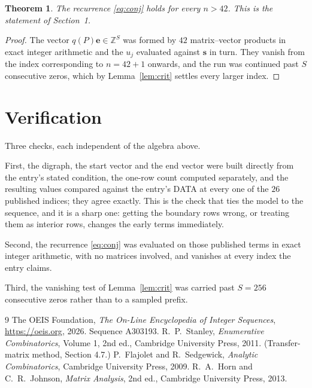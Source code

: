 \documentclass[11pt,a4paper]{article}
\theoremstyle{plain}
\newtheorem{theorem}{Theorem}
\theoremstyle{definition}
\begin{document}
\begin{theorem}
The recurrence \eqref{eq:conj} holds for every $n>42$. This is the statement of
Section~1.
\end{theorem}

\begin{proof}
The vector $q(P)\mathbf{e}\in\mathbb{Z}^{S}$ was formed by $42$ matrix--vector
products in exact integer arithmetic and the $u_j$ evaluated against $\mathbf{s}$ in turn.
They vanish from the index corresponding to $n=42+1$ onwards, and the run was continued
past $S$ consecutive zeros, which by Lemma~\ref{lem:crit} settles every larger index.
\end{proof}

\section{Verification}

Three checks, each independent of the algebra above.

First, the digraph, the start vector and the end vector were built directly from the
entry's stated condition, the one-row count computed separately, and the resulting values
compared against the entry's DATA at every one of the $26$ published indices; they
agree exactly. This is the check that ties the model to the sequence, and it is a sharp one:
getting the boundary rows wrong, or treating them as interior rows, changes the early terms
immediately.

Second, the recurrence \eqref{eq:conj} was evaluated on those published terms in exact
integer arithmetic, with no matrices involved, and vanishes at every index the entry claims.

Third, the vanishing test of Lemma~\ref{lem:crit} was carried past $S=256$ consecutive
zeros rather than to a sampled prefix.

\begin{thebibliography}{9}
 The OEIS Foundation, \emph{The On-Line Encyclopedia of Integer
Sequences}, \url{https://oeis.org}, 2026. Sequence A303193.
 R.~P.~Stanley, \emph{Enumerative Combinatorics}, Volume 1, 2nd ed.,
Cambridge University Press, 2011. (Transfer-matrix method, Section 4.7.)
 P.~Flajolet and R.~Sedgewick, \emph{Analytic Combinatorics}, Cambridge
University Press, 2009.
 R.~A.~Horn and C.~R.~Johnson, \emph{Matrix Analysis}, 2nd ed., Cambridge
University Press, 2013.
\end{thebibliography}
\end{document}
